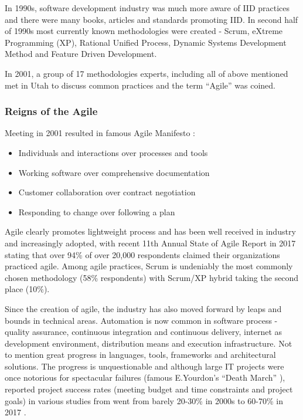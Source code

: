 \documentclass{article}
\begin{document}
In 1990s, software development industry was much more aware of IID practices and there were many books, articles and standards promoting IID. In second half of 1990s most currently known methodologies were created - Scrum, eXtreme Programming (XP), Rational Unified Process, Dynamic Systems Development Method and Feature Driven Development.

In 2001, a group of 17 methodologies experts, including all of above mentioned met in Utah to discuss common practices and the term ``Agile'' was coined.

\subsubsection{Reigns of the Agile}

Meeting in 2001 resulted in famous Agile Manifesto \cite{beck2001agile}:
\begin{itemize}
  \item Individuals and interactions over processes and tools
  \item Working software over comprehensive documentation
  \item Customer collaboration over contract negotiation
  \item Responding to change over following a plan
\end{itemize}

Agile clearly promotes lightweight process and has been well received in industry and increasingly adopted, with recent 11th Annual State of Agile Report in 2017 \cite{one201711th} stating that over 94\% of over 20,000 respondents claimed their organizations practiced agile. %
Among agile practices, Scrum is undeniably the most commonly chosen methodology (58\% respondents) with Scrum/XP hybrid taking the second place (10\%).

Since the creation of agile, the industry has also moved forward by leaps and bounds in technical areas. Automation is now common in software process - quality assurance, continuous integration and continuous delivery, internet as development environment, distribution means and execution infrastructure. Not to mention great progress in languages, tools, frameworks and architectural solutions. \cite{fuggetta2014software}
The progress is unquestionable and although large IT projects were once notorious for spectacular failures (famous E.Yourdon's ``Death March'' \cite{yourdon1997death}), reported project success rates (meeting budget and time constraints and project goals) in various studies from went from barely 20-30\% in 2000s \cite{kaur2013software} to 60-70\% in 2017 \cite{pmi2017pulse}.
\end{document}
